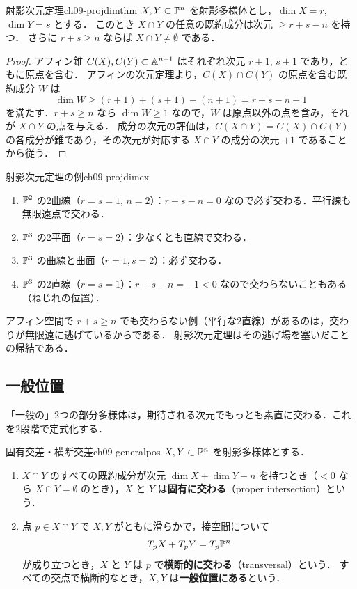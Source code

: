 \begin{mythm}{射影次元定理}{ch09-projdimthm}
$X,Y\subset\mathbb{P}^n$ を射影多様体とし，$\dim X=r$, $\dim Y=s$ とする．
このとき $X\cap Y$ の任意の既約成分は次元 $\ge r+s-n$ を持つ．
さらに $r+s\ge n$ ならば $X\cap Y\neq\emptyset$ である．
\end{mythm}

\begin{proof}
アフィン錐 $C(X),C(Y)\subset\mathbb{A}^{n+1}$ はそれぞれ次元 $r+1$, $s+1$ であり，ともに原点を含む．
アフィンの次元定理より，$C(X)\cap C(Y)$ の原点を含む既約成分 $W$ は
\[
  \dim W\ge(r+1)+(s+1)-(n+1)=r+s-n+1
\]
を満たす．$r+s\ge n$ なら $\dim W\ge1$ なので，$W$ は原点以外の点を含み，それが $X\cap Y$ の点を与える．
成分の次元の評価は，$C(X\cap Y)=C(X)\cap C(Y)$ の各成分が錐であり，その次元が対応する $X\cap Y$ の成分の次元 $+1$ であることから従う．
\end{proof}

\begin{myex}{射影次元定理の例}{ch09-projdimex}
\begin{enumerate}
  \item $\mathbb{P}^2$ の2曲線（$r=s=1$, $n=2$）：$r+s-n=0$ なので必ず交わる．平行線も無限遠点で交わる．
  \item $\mathbb{P}^3$ の2平面（$r=s=2$）：少なくとも直線で交わる．
  \item $\mathbb{P}^3$ の曲線と曲面（$r=1,s=2$）：必ず交わる．
  \item $\mathbb{P}^3$ の2直線（$r=s=1$）：$r+s-n=-1<0$ なので交わらないこともある（ねじれの位置）．
\end{enumerate}
\end{myex}

\begin{note}
アフィン空間で $r+s\ge n$ でも交わらない例（平行な2直線）があるのは，交わりが無限遠に逃げているからである．
射影次元定理はその逃げ場を塞いだことの帰結である．
\end{note}

\subsection{一般位置}

「一般の」2つの部分多様体は，期待される次元でもっとも素直に交わる．これを2段階で定式化する．

\begin{mydef}{固有交差・横断交差}{ch09-generalpos}
$X,Y\subset\mathbb{P}^n$ を射影多様体とする．
\begin{enumerate}
  \item $X\cap Y$ のすべての既約成分が次元 $\dim X+\dim Y-n$ を持つとき（$<0$ なら $X\cap Y=\emptyset$ のとき），$X$ と $Y$ は\textbf{固有に交わる}（proper intersection）という．
  \item 点 $p\in X\cap Y$ で $X,Y$ がともに滑らかで，接空間について
  \[
    T_pX+T_pY=T_p\mathbb{P}^n
  \]
  が成り立つとき，$X$ と $Y$ は $p$ で\textbf{横断的に交わる}（transversal）という．
  すべての交点で横断的なとき，$X,Y$ は\textbf{一般位置にある}という．
\end{enumerate}
\end{mydef}

